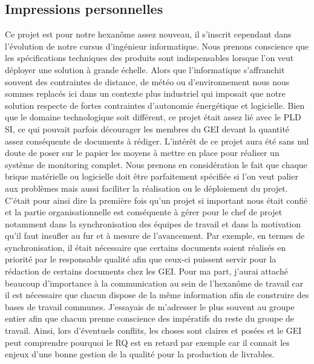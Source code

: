 \subsection{Impressions personnelles}
Ce projet est pour notre hexanôme assez nouveau, il s'inscrit cependant dans l'évolution de notre cursus d'ingénieur informatique. Nous prenons conscience que les spécifications techniques des produits sont indispensables lorsque l'on veut déployer une solution à grande échelle. Alors que l'informatique s'affranchit souvent des contraintes de distance, de météo ou d'environnement nous nous sommes replacés ici dans un contexte plus industriel qui imposait que notre solution respecte de fortes contraintes d'autonomie énergétique et logicielle. Bien que le domaine technologique soit différent, ce projet était assez lié avec le PLD SI, ce qui pouvait parfois décourager les membres du GEI devant la quantité assez conséquente de documents à rédiger. L'intérêt de ce projet aura été sans nul doute de poser sur le papier les moyens à mettre en place pour réaliser un système de monitoring complet. Nous prenons en considération le fait que chaque brique matérielle ou logicielle doit être parfaitement spécifiée si l'on veut palier aux problèmes mais aussi faciliter la réalisation ou le déploiement du projet. C'était pour ainsi dire la première fois qu'un projet si important nous était confié et la partie organisationnelle est conséquente à gérer pour le chef de projet notamment dans la synchronisation des équipes de travail et dans la motivation qu'il faut insufler au fur et à mesure de l'avancement. Par exemple, en termes de synchronisation, il était nécessaire que certains documents soient réalisés en priorité par le responsable qualité afin que ceux-ci puissent servir pour la rédaction de certains documents chez les GEI. Pour ma part, j'aurai attaché beaucoup d'importance à la communication au sein de l'hexanôme de travail car il est nécessaire que chacun dispose de la même information afin de construire des bases de travail communes. J'essayais de m'adresser le plus souvent au groupe entier afin que chacun prenne conscience des impératifs du reste du groupe de travail. Ainsi, lors d'éventuels conflits, les choses sont claires et posées et le GEI peut comprendre pourquoi le RQ est en retard par exemple car il connait les enjeux d'une bonne gestion de la qualité pour la production de livrables.

